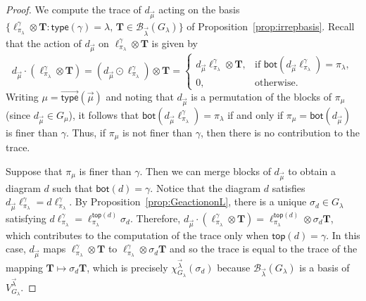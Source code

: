 \documentclass[ALCO,Unicode]{cedram}
\newcommand{\vtype}{\overrightarrow{\mathsf{type}}}
\begin{document}
\begin{proof}
We compute the trace of $d_{\vec{\mu}}$ acting on the basis
$\{ \ell_{\pi_\lambda}^\gamma \otimes \mathbf{T} :
    \mathsf{type}(\gamma) = \lambda, \,
    \mathbf{T} \in \mathcal{B}_{\vec{\lambda}}(G_\lambda) \}$
of Proposition~\ref{prop:irrepbasis}.
Recall that the action of $d_{\vec{\mu}}$ on $\ell_{\pi_\lambda}^\gamma \otimes \mathbf{T}$
is given by
\begin{equation*}
    d_{\vec{\mu}} \cdot (\ell_{\pi_\lambda}^\gamma \otimes \mathbf{T})
    = (d_{\vec{\mu}} \odot \ell_{\pi_\lambda}^\gamma) \otimes \mathbf{T}
    =
    \begin{cases}
        d_{\vec{\mu}} \ell_{\pi_\lambda}^\gamma \otimes \mathbf{T}, & \text{if~} \mathsf{bot}(d_{\vec{\mu}} \ell_{\pi_\lambda}^\gamma) = \pi_\lambda,\\
        0, & \text{otherwise.}
    \end{cases}
\end{equation*}
Writing $\mu = \vtype(\vec{\mu})$ and noting that $d_{\vec{\mu}}$ is
a permutation of the blocks of $\pi_\mu$ (since $d_{\vec{\mu}} \in G_\mu$),
it follows that $\mathsf{bot}(d_{\vec{\mu}} \ell_{\pi_\lambda}^\gamma) = \pi_\lambda$
if and only if $\pi_\mu = \mathsf{bot}(d_{\vec{\mu}})$ is finer than $\gamma$.
Thus, if $\pi_\mu$ is not finer than $\gamma$, then there is no contribution to
the trace.

Suppose that $\pi_\mu$ is finer than $\gamma$. Then we can merge blocks of
$d_{\vec{\mu}}$ to obtain a diagram $d$ such that $\mathsf{bot}(d) = \gamma$.
Notice that the diagram $d$ satisfies
$d_{\vec{\mu}} \ell_{\pi_\lambda}^\gamma = d \ell_{\pi_\lambda}^\gamma$.
By Proposition~\ref{prop:GeactiononL}, there is a unique $\sigma_{d} \in G_\lambda$
satisfying $d \ell_{\pi_\lambda}^\gamma = \ell_{\pi_\lambda}^{\mathsf{top}(d)} \sigma_{d}$.
Therefore, $d_{\vec{\mu}} \cdot (\ell_{\pi_\lambda}^\gamma \otimes \mathbf{T})
= \ell_{\pi_\lambda}^{\mathsf{top}(d)} \otimes \sigma_{d} \mathbf{T}$,
which contributes to the computation of the trace only when $\mathsf{top}(d) = \gamma$.
In this case,
$d_{\vec{\mu}}$ maps $\ell_{\pi_\lambda}^\gamma \otimes \mathbf{T}$
to $\ell_{\pi_\lambda}^\gamma \otimes \sigma_d \mathbf{T}$ and so
the trace is equal to the trace of the mapping
$\mathbf{T} \mapsto \sigma_d \mathbf{T}$,
which is precisely $\chi^{\vec{\lambda}}_{G_\lambda}(\sigma_{d})$
because $\mathcal{B}_{\vec{\lambda}}(G_\lambda)$
is a basis of $V^{\vec{\lambda}}_{G_\lambda}$.
\end{proof}
\end{document}
